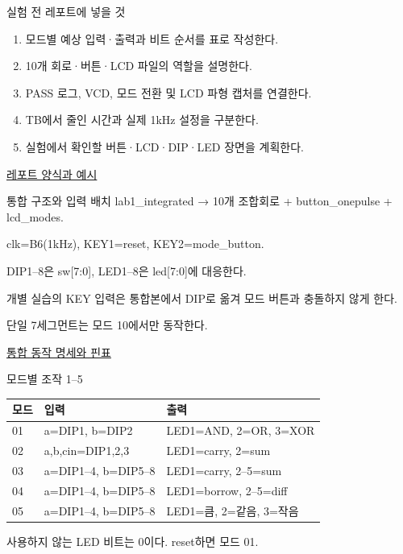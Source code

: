 \begin{frame}{실험 전 레포트에 넣을 것}\relax
\small
\begin{enumerate}\setlength{\itemsep}{0.22cm}
\item 모드별 예상 입력·출력과 비트 순서를 표로 작성한다.
\item 10개 회로·버튼·LCD 파일의 역할을 설명한다.
\item PASS 로그, VCD, 모드 전환 및 LCD 파형 캡처를 연결한다.
\item TB에서 줄인 시간과 실제 1kHz 설정을 구분한다.
\item 실험에서 확인할 버튼·LCD·DIP·LED 장면을 계획한다.
\end{enumerate}
\href{https://github.com/Glaysia/ece2_26_2_2/blob/daily/0910/example/fpga_projects_hdl/LAB1/docs/reports.md}{레포트 양식과 예시}
\end{frame}

\begin{frame}[label=integrated-vivado-modes]{통합 구조와 입력 배치}\relax
\small
lab1\_integrated → 10개 조합회로 + button\_onepulse + lcd\_modes.\par\vspace{0.22cm}clk=B6(1kHz), KEY1=reset, KEY2=mode\_button.\par\vspace{0.22cm}DIP1–8은 sw[7:0], LED1–8은 led[7:0]에 대응한다.\par\vspace{0.22cm}개별 실습의 KEY 입력은 통합본에서 DIP로 옮겨 모드 버튼과 충돌하지 않게 한다.\par\vspace{0.22cm}단일 7세그먼트는 모드 10에서만 동작한다.\par\href{https://github.com/Glaysia/ece2_26_2_2/blob/daily/0910/example/fpga_projects_hdl/LAB1/docs/integrated.md}{통합 동작 명세와 핀표}
\end{frame}

\begin{frame}{모드별 조작 1–5}\relax
\small
\begin{center}\renewcommand{\arraystretch}{1.45}
\begin{tabular}{l|l|l}
모드 & 입력 & 출력\\\hline
01 & a=DIP1, b=DIP2 & LED1=AND, 2=OR, 3=XOR\\
02 & a,b,cin=DIP1,2,3 & LED1=carry, 2=sum\\
03 & a=DIP1–4, b=DIP5–8 & LED1=carry, 2–5=sum\\
04 & a=DIP1–4, b=DIP5–8 & LED1=borrow, 2–5=diff\\
05 & a=DIP1–4, b=DIP5–8 & LED1=큼, 2=같음, 3=작음\\
\end{tabular}\end{center}
사용하지 않는 LED 비트는 0이다. reset하면 모드 01.\par
\end{frame}

